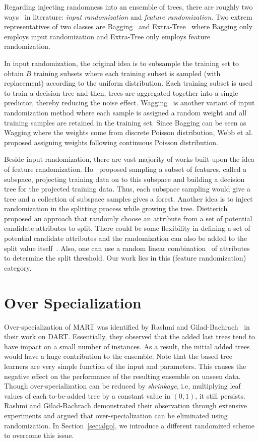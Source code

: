 \documentclass{article} %
\begin{document}
Regarding injecting randomness into an ensemble of trees, there are roughly two ways~\cite{PV07} in literature: \emph{input randomization} and \emph{feature randomization}. Two extrem representatives of two classes are Bagging~\cite{Breiman96} and Extra-Tree~\cite{GEW06} where Bagging only employs input randomization and Extra-Tree only employs feature randomization.

In input randomization, the original idea is to subsample the training set to obtain $B$ training subsets where each training subset is sampled (with replacement) according to the uniform distribution.  Each training subset is used to train a decision tree and then, trees are aggregated together into a single predictor, thereby reducing the noise effect. Wagging~\cite{BK98} is another variant of input randomization method where each sample is assigned a random weight and all training samples are retained in the training set. Since Bagging can be seen as Wagging where the weights come from discrete Poisson distribution, Webb et al.~\cite{WZ04} proposed assigning weights following continuous Poisson distribution.  

Beside input randomization, there are vast majority of works built upon the idea of feature randomization. Ho~\cite{Ho98} proposed sampling a subset of features, called a subspace, projecting training data on to this subspace and building a decision tree for the projected training data. Thus, each subspace sampling would give a tree and a collection of subspace samples gives a forest. Another idea is to inject randomization in the splitting process while growing the tree. Dietterich~\cite{Dietterich00} proposed an approach that  randomly choose an attribute from a set of potential candidate attributes to split. There could be some flexibility in defining a set of potential candidate attributes and the randomization can also be added to the split value itself~\cite{CZ01,GEW06}. Also, one can use a random linear combination~\cite{Breiman2001} of attributes to determine the split threshold. Our work lies in this (feature randomization) category.
\section{Over Specialization} \label{sec:over-spe}

Over-specialization of MART was identified  by Rashmi and Gilad-Bachrach~\cite{dart} in their work on DART. Essentially, they observed that the added last trees tend to have impact on a small number of instances. As a result, the initial added trees would have a huge contribution to the ensemble. Note that the based tree learners are very simple function of the input and parameters. This causes the negative effect on the performance of the resulting ensemble on unseen data. Though over-specialization can be reduced by \emph{shrinkage}, i.e, multiplying leaf values of each to-be-added tree by a constant value in $(0,1)$, it still persists.  Rashmi and Gilad-Bachrach demonstrated their observation through extensive experiments and argued that over-specialization can be eliminated using randomization.     In Section~\ref{sec:algo}, we introduce a different randomized scheme to overcome this issue.
\end{document}
